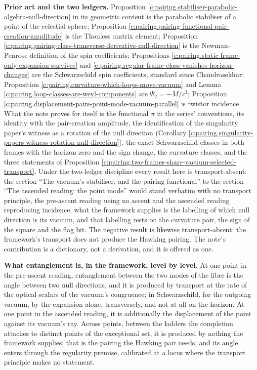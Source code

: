 \documentclass[11pt]{article}
\theoremstyle{definition}
\theoremstyle{plain}
\providecommand{\pv}{}\renewcommand{\pv}{\pi}
\begin{document}
\label{c:note.pairing.setting-what-does-two-claims-3}
\textbf{Prior art and the two ledgers.} Proposition \ref{c:pairing.stabiliser-parabolic-algebra-null-direction} in its geometric content is the parabolic stabiliser of a point of the celestial sphere; Proposition \ref{c:pairing.pairing-functional-pair-creation-amplitude} is the Thouless matrix element; Proposition \ref{c:pairing.pairing-class-transverse-derivative-null-direction} is the Newman-Penrose definition of the spin coefficients; Propositions \ref{c:pairing.static-frame-only-expansion-survives} and \ref{c:pairing.regular-frame-class-vanishes-horizon-changes} are the Schwarzschild spin coefficients, standard since Chandrasekhar; Proposition \ref{c:pairing.curvature-which-loops-move-vacuum} and Lemma \ref{c:pairing.loop-classes-are-weyl-components} are $\Psi_{2} = -M/r^{3}$; Proposition \ref{c:pairing.displacement-pairs-point-mode-vacuum-parallel} is twistor incidence. What the note proves for itself is the functional $\pv$ in the series' conventions, its identity with the pair-creation amplitude, the identification of the singularity paper's witness as a rotation of the null direction (Corollary \ref{c:pairing.singularity-papers-witness-rotation-null-direction}), the exact Schwarzschild classes in both frames with the horizon zero and the sign change, the curvature classes, and the three statements of Proposition \ref{c:pairing.two-frames-share-vacuum-selected-transport}. Under the two-ledger discipline every result here is transport-absent: the section ``The vacuum's stabiliser, and the pairing functional'' to the section ``The ascended reading: the point mode'' would stand verbatim with no transport principle, the pre-ascent reading using no ascent and the ascended reading reproducing incidence; what the framework supplies is the labelling of which null direction is its vacuum, and that labelling rests on the curvature pair, the sign of the square and the flag bit. The negative result is likewise transport-absent: the framework's transport does not produce the Hawking pairing. The note's contribution is a dictionary, not a derivation, and it is offered as one.

\label{c:note.pairing.setting-what-does-two-claims-4}
\textbf{What entanglement is, in the framework, level by level.} At one point in the pre-ascent reading, entanglement between the two modes of the fibre is the angle between two null directions, and it is produced by transport at the rate of the optical scalars of the vacuum's congruence; in Schwarzschild, for the outgoing vacuum, by the expansion alone, transversely, and not at all on the horizon. At one point in the ascended reading, it is additionally the displacement of the point against its vacuum's ray. Across points, between the ladders the completion attaches to distinct points of the exceptional set, it is produced by nothing the framework supplies; that is the pairing the Hawking pair needs, and its angle enters through the regularity premise, calibrated at a locus where the transport principle makes no statement.
\end{document}
